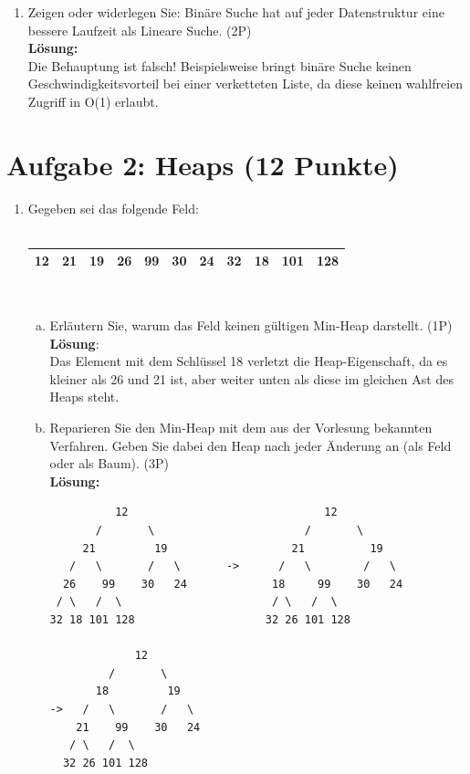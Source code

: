 \documentclass{scrartcl}
\begin{document}
\begin{enumerate}[(1)]
\item Zeigen oder widerlegen Sie: Bin\"are Suche hat auf jeder Datenstruktur eine bessere Laufzeit als Lineare Suche. (2P)\\
\textbf{Lösung:}\\
Die Behauptung ist falsch! Beispielsweise bringt binäre Suche keinen Geschwindigkeitsvorteil bei einer verketteten Liste, da diese keinen wahlfreien Zugriff in O(1) erlaubt.
\end{enumerate}

\section*{Aufgabe 2: Heaps (12 Punkte)}
\begin{enumerate}[(1)]
\item Gegeben sei das folgende Feld: \\
\ \\
\begin{tabular}{|c|c|c|c|c|c|c|c|c|c|c|}
\hline
12 & 21 & 19 & 26 & 99 & 30 & 24 & 32 & 18 & 101 & 128 \\ 
\hline 
\end{tabular} \\
\begin{enumerate}[(a)]
	\item Erläutern Sie, warum das Feld keinen gültigen Min-Heap darstellt. (1P)\\
	\textbf{Lösung}:\\
	Das Element mit dem Schlüssel 18 verletzt die Heap-Eigenschaft, da es kleiner als 26 und 21 ist, aber weiter unten als diese im gleichen Ast des Heaps steht.
	
	\item Reparieren Sie den Min-Heap mit dem aus der Vorlesung bekannten Verfahren. Geben Sie dabei den Heap nach jeder Änderung an (als Feld oder als Baum). (3P)\\
\textbf{Lösung:}\\
\begin{verbatim}
          12                              12 
       /       \                       /       \
     21         19                   21          19
   /   \       /   \       ->      /   \        /   \
  26    99    30   24             18     99    30   24
 / \   /  \                       / \   /  \
32 18 101 128                    32 26 101 128

             12 
         /       \
       18         19
->   /   \       /   \
    21    99    30   24
   / \   /  \
  32 26 101 128
\end{verbatim}
\end{enumerate}


\end{enumerate}
\end{document}
